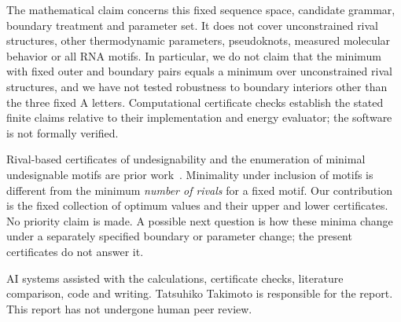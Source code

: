 \documentclass[10pt,a4paper]{article}
\begin{document}
The mathematical claim concerns this fixed sequence space, candidate grammar, boundary treatment and parameter set. It does not cover unconstrained rival structures, other thermodynamic parameters, pseudoknots, measured molecular behavior or all RNA motifs. In particular, we do not claim that the minimum with fixed outer and boundary pairs equals a minimum over unconstrained rival structures, and we have not tested robustness to boundary interiors other than the three fixed A letters. Computational certificate checks establish the stated finite claims relative to their implementation and energy evaluator; the software is not formally verified.

Rival-based certificates of undesignability and the enumeration of minimal undesignable motifs are prior work~\cite{rigende,fastmotif,journal}. Minimality under inclusion of motifs is different from the minimum \emph{number of rivals} for a fixed motif. Our contribution is the fixed collection of optimum values and their upper and lower certificates. No priority claim is made. A possible next question is how these minima change under a separately specified boundary or parameter change; the present certificates do not answer it.

AI systems assisted with the calculations, certificate checks, literature comparison, code and writing. Tatsuhiko Takimoto is responsible for the report. This report has not undergone human peer review.
\end{document}
